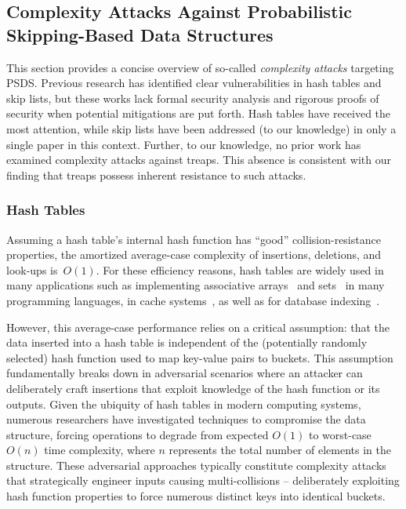 \subsection{Complexity Attacks Against Probabilistic Skipping-Based Data Structures}

This section provides a concise overview of so-called \emph{complexity attacks} targeting PSDS. Previous research has identified clear vulnerabilities in hash tables and skip lists, but these works lack formal security analysis and rigorous proofs of security when potential mitigations are put forth. Hash tables have received the most attention, while skip lists have been addressed (to our knowledge) in only a single paper in this context. Further, to our knowledge, no prior work has examined complexity attacks against treaps. This absence is consistent with our finding that treaps possess inherent resistance to such attacks.

\subsubsection{Hash Tables} Assuming a hash table's internal hash function has ``good'' collision-resistance properties, the amortized average-case complexity of insertions, deletions, and look-ups is~$O(1)$. For these efficiency reasons, hash tables are widely used in many applications such as implementing associative arrays~\cite{mehlhorn2008hash} and sets~\cite{blandy2021programming} in many programming languages, in cache systems~\cite{istvan2015hash}, as well as for database indexing~\cite{zobel2001memory}.

However, this average-case performance relies on a critical assumption: that the data inserted into a hash table is independent of the (potentially randomly selected) hash function used to map key-value pairs to buckets. This assumption fundamentally breaks down in adversarial scenarios where an attacker can deliberately craft insertions that exploit knowledge of the hash function or its outputs. Given the ubiquity of hash tables in modern computing systems, numerous researchers \cite{paxson1999bro, CrosbyW03, bar2007remote, eckhoff2009hash, klink2011efficient, aumasson2012hash,bottinelli2025hash} have investigated techniques to compromise the data structure, forcing operations to degrade from expected $O(1)$ to worst-case $O(n)$ time complexity, where $n$ represents the total number of elements in the structure. These adversarial approaches typically constitute complexity attacks that strategically engineer inputs causing multi-collisions -- deliberately exploiting hash function properties to force numerous distinct keys into identical buckets.


